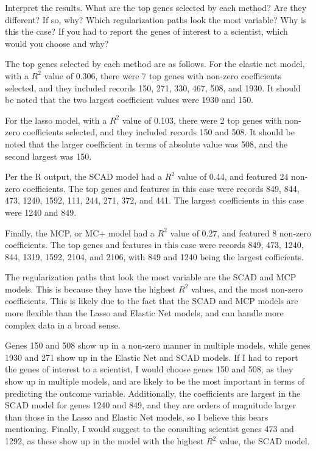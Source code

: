 \documentclass[12pt, letterpaper]{article}
\begin{document}
Interpret the results. What are the top genes selected by each method? Are they different? If so, why? Which regularization paths look the most variable? Why is this the case? If you had to report 
the genes of interest to a scientist, which would you choose and why? 

The top genes selected by each method are as follows. For the elastic net model, with a $R^2$ value of 0.306, there were 7 top genes with non-zero coefficients selected, and they included records 150, 271, 330, 467, 508, and 1930. It should be noted that the two largest coefficient values were 1930 and 150. 

For the lasso model, with a $R^2$ value of 0.103, there were 2 top genes with non-zero coefficients selected, and they included records 150 and 508. It should be noted that the larger coefficient in terms of absolute value was 508, and the second largest was 150. 

Per the R output, the SCAD model had a $R^2$ value of 0.44, and featured 24 non-zero coefficients. The top genes and features in this case were records 849, 844, 473, 1240, 1592, 111, 244, 271, 372, and 441. The largest coefficients in this case were 1240 and 849. 

Finally, the MCP, or MC+ model had a $R^2$ value of 0.27, and featured 8 non-zero coefficients. The top genes and features in this case were records 849, 473, 1240, 844, 1319, 1592, 2104, and 2106, with 849 and 1240 being the largest cofficients. 

The regularization paths that look the most variable are the SCAD and MCP models. This is because they have the highest $R^2$ values, and the most non-zero coefficients. This is likely due to the fact that the SCAD and MCP models are more flexible than the Lasso and Elastic Net models, and can handle more complex data in a broad sense. 

Genes 150 and 508 show up in a non-zero manner in multiple models, while genes 1930 and 271 show up in the Elastic Net and SCAD models. If I had to report the genes of interest to a scientist, I would choose genes 150 and 508, as they show up in multiple models, and are likely to be the most important in terms of predicting the outcome variable. Additionally, the coefficients are largest in the SCAD model for genes 1240 and 849, and they are orders of magnitude larger than those in the Lasso and Elastic Net models, so I believe this bears mentioning. Finally, I would suggest to the consulting scientist genes 473 and 1292, as these show up in the model with the highest $R^2$ value, the SCAD model. 
\end{document}

